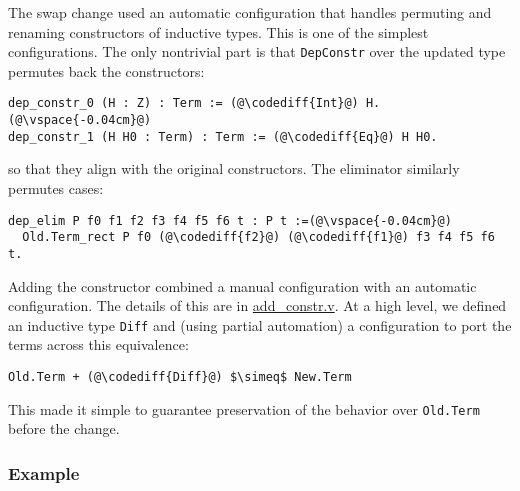 The swap change used an automatic configuration that handles permuting and renaming constructors of inductive types.
This is one of the simplest configurations.
The only nontrivial part is that \lstinline{DepConstr} over the updated type permutes back the constructors:

\begin{lstlisting}[backgroundcolor=\color{cyan!30}]
dep_constr_0 (H : Z) : Term := (@\codediff{Int}@) H.(@\vspace{-0.04cm}@)
dep_constr_1 (H H0 : Term) : Term := (@\codediff{Eq}@) H H0.
\end{lstlisting}
so that they align with the original constructors.
The eliminator similarly permutes cases:

\begin{lstlisting}[backgroundcolor=\color{cyan!30}]
dep_elim P f0 f1 f2 f3 f4 f5 f6 t : P t :=(@\vspace{-0.04cm}@)
  Old.Term_rect P f0 (@\codediff{f2}@) (@\codediff{f1}@) f3 f4 f5 f6 t.
\end{lstlisting}

Adding the constructor combined a manual configuration with an automatic configuration.
The details of this are in \href{https://github.com/uwplse/pumpkin-pi/blob/master/plugin/coq/playground/add_constr.v}{add_constr.v}.
At a high level, we defined an inductive type \lstinline{Diff} and (using partial automation) a configuration to port the terms across this equivalence:

\begin{lstlisting}
Old.Term + (@\codediff{Diff}@) $\simeq$ New.Term
\end{lstlisting}
This made it simple to guarantee preservation of the behavior over \lstinline{Old.Term} before the change.

\subsubsection{Example}

